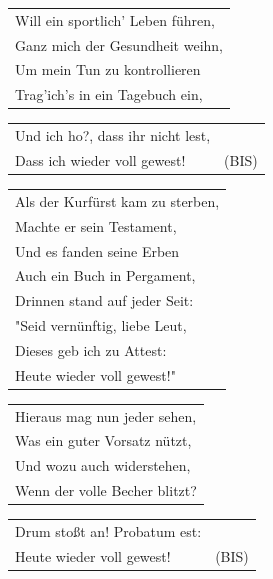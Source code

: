 \documentclass{article}
\begin{document}
\begin{flushleft}
\begin{tabularx}{\textwidth} {
    >{\raggedright\arraybackslash}X}
Will ein sportlich’ Leben führen,\\
Ganz mich der Gesundheit weihn,\\
Um mein Tun zu kontrollieren\\
Trag’ich’s in ein Tagebuch ein,\\
\end{tabularx}
\begin{tabularx}{\textwidth} {
    >{\raggedright\arraybackslash}X |c}
Und ich ho?, dass ihr nicht lest, &\\
Dass ich wieder voll gewest! & (BIS)\\
\end{tabularx}
\end{flushleft}
\begin{flushleft}
\begin{tabularx}{\textwidth} {
    >{\raggedright\arraybackslash}X}
Als der Kurfürst kam zu sterben,\\
Machte er sein Testament,\\
Und es fanden seine Erben\\
Auch ein Buch in Pergament,\\
Drinnen stand auf jeder Seit:\\
"Seid vernünftig, liebe Leut,\\
Dieses geb ich zu Attest:\\
Heute wieder voll gewest!"\\
\end{tabularx}
\end{flushleft}
\begin{flushleft}
\begin{tabularx}{\textwidth} {
    >{\raggedright\arraybackslash}X}
Hieraus mag nun jeder sehen,\\
Was ein guter Vorsatz nützt,\\
Und wozu auch widerstehen,\\
Wenn der volle Becher blitzt?\\
\end{tabularx}
\begin{tabularx}{\textwidth} {
    >{\raggedright\arraybackslash}X |c}
Drum stoßt an! Probatum est: & \\
Heute wieder voll gewest! & (BIS) \\
\end{tabularx}
\end{flushleft}
\end{document}
